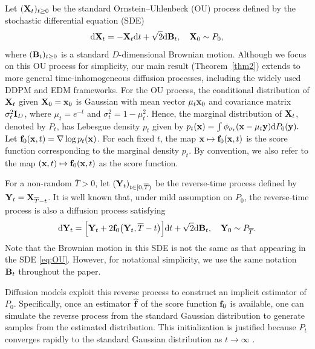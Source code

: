 \documentclass[11pt,a4paper,final]{article}
\numberwithin{equation}{section}
\theoremstyle{remark}
\newcommand{\bB}{{\bf B}}
\newcommand{\bff}{{\bf f}}
\newcommand{\bI}{{\bf I}}
\newcommand{\bx}{{\bf x}}
\newcommand{\bX}{{\bf X}}
\newcommand{\by}{{\bf y}}
\newcommand{\bY}{{\bf Y}}
\newcommand{\be}{\begin{equation}}
\newcommand{\ee}{\end{equation}}
\newcommand{\bean}{\setlength\arraycolsep{1pt}\begin{eqnarray*}}
\newcommand{\eean}{\end{eqnarray*}}
\def\d{{\rm d}}
\begin{document}
Let $( \bX_{t} )_{t \geq 0}$ be the standard Ornstein--Uhlenbeck (OU) process defined by the stochastic differential equation (SDE)
\be
\d {\bX}_t = -  {\bX}_t \d t + \sqrt{2} \d \bB_t,\quad \bX_0 \sim P_0,
\label{eq:OU}
\ee
where $( \bB_{t} )_{t \geq 0} $ is a standard $D$-dimensional Brownian motion.
Although we focus on this OU process for simplicity, our main result (Theorem~\ref{thm2}) extends to more general time-inhomogeneous diffusion processes, including the widely used DDPM \citep{ho2020denoising} and EDM \citep{karras2022elucidating} frameworks.
For the OU process, the conditional distribution of $\bX_t$ given $\bX_0 = \bx_0$ is Gaussian with mean vector $\mu_t \bx_0$ and covariance matrix $ \sigma_t^2 \bI_{D}$, where $\mu_t = e^{-t}$ and $\sigma_t^2 = 1-\mu_t^2$.
Hence, the marginal distribution of $\bX_{t}$, denoted by $P_{t}$, has Lebesgue density $p_{t}$ given by
$
p_{t} (\bx) = \int \phi_{\sigma_{t}} (\bx - \mu_{t} \by ) \d P_{0} (\by).
$
Let  $\bff_0 (\bx, t) = \nabla \log p_t(\bx)$.
For each fixed $t$, the map $\bx \mapsto \bff_0(\bx, t)$ is the score function corresponding to the marginal density $p_t$.
By convention, we also refer to the map $(\bx,t) \mapsto \bff_0(\bx,t)$ as the score function.

For a non-random $\overline{T} > 0$, let $(\bY_{t})_{t \in [0, \overline{T}) }$ be the reverse-time process defined by $\bY_{t} = \bX_{\overline{T}-t}$.
It is well known \citep{anderson1982reverse} that, under mild assumption on $P_{0}$, the reverse-time process is also a diffusion process satisfying
\bean
\d \bY_{t} = \Big[ \bY_t + 2  \bff_0 \big (\bY_t, \overline T - t \big) \Big] \d t + \sqrt{2} \d \bB_t,\quad \bY_0 \sim P_{\overline{T}}.
\eean
Note that the Brownian motion in this SDE is not the same as that appearing in the SDE \eqref{eq:OU}.
However, for notational simplicity, we use the same notation $\bB_t$ throughout the paper.

Diffusion models exploit this reverse process to construct an implicit estimator of $P_0$.
Specifically, once an estimator $\widehat{\bff}$ of the score function $\bff_{0}$ is available, one can simulate the reverse process from the standard Gaussian distribution to generate samples from the estimated distribution.
This initialization is justified because $P_t$ converges rapidly to the standard Gaussian distribution as $t \to \infty$ \citep{bakry2014analysis}.
\end{document}
